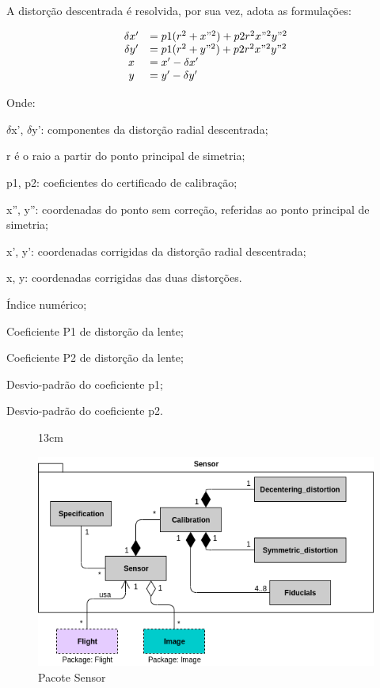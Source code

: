 A distorção descentrada é resolvida, por sua vez, adota as formulações: 

\begin{equation} \label{des1}
\begin{array}{cl}
\delta x' &= p1(r^{2}+x"^{2})+p2r^{2}x"^{2}y"^{2} \\
\delta y' &= p1(r^{2}+y"^{2})+p2r^{2}x"^{2}y"^{2} \\ 
x &= x' - \delta x'\\
y &= y' - \delta y'
\end{array}
\end{equation}

Onde:

$\delta$x', $\delta$y': componentes da distorção radial descentrada;

r é o raio a partir do ponto principal de simetria;

p1, p2: coeficientes do certificado de calibração;

x”, y”: coordenadas do ponto sem correção, referidas ao ponto principal de simetria;

x’, y’: coordenadas corrigidas da distorção radial descentrada;

x, y: coordenadas corrigidas das duas distorções.

\begin{description}[labelwidth=2cm, itemsep=-0.3cm]
\item [Classe Decentering\_distortion]
\item[Id:] Índice numérico;
\item[P1:] Coeficiente P1 de distorção da lente;
\item[P2:] Coeficiente P2 de distorção da lente; 
\item[Sigma\_p1:] Desvio-padrão do coeficiente p1;
\item[Sigma\_p2:] Desvio-padrão do coeficiente p2.
\end{description}

\begin{figure}[!ht]{13cm}
  \caption{Pacote Sensor} \label{pack_sen}
  \centering
  \includegraphics[width=1\hsize]{figuras/package_sensor.png}
\end{figure}


